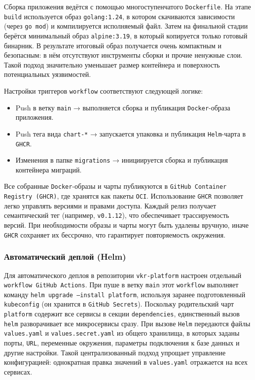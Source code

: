 Сборка приложения ведётся с помощью многоступенчатого \texttt{Dockerfile}. На этапе \texttt{build} используется образ \texttt{golang:1.24}, в котором скачиваются зависимости (через \texttt{go mod}) и компилируется исполняемый файл. Затем на финальной стадии берётся минимальный образ \texttt{alpine:3.19}, в который копируется только готовый бинарник. В результате итоговый образ получается очень компактным и безопасным: в нём отсутствуют инструменты сборки и прочие ненужные слои. Такой подход значительно уменьшает размер контейнера и поверхность потенциальных уязвимостей.

Настройки триггеров \texttt{workflow} соответствуют следующей логике:
\begin{itemize}
    \item Push в ветку \texttt{main} → выполняется сборка и публикация \texttt{Docker}-образа приложения.
    \item Push тега вида \texttt{chart-*} → запускается упаковка и публикация \texttt{Helm}-чарта в \texttt{GHCR}.
    \item Изменения в папке \texttt{migrations} → инициируется сборка и публикация контейнера миграций.
\end{itemize}
\noindent Все собранные \texttt{Docker}-образы и чарты публикуются в \texttt{GitHub Container Registry (GHCR)}, где хранятся как пакеты \texttt{OCI}. Использование \texttt{GHCR} позволяет легко управлять версиями и правами доступа. Каждый релиз получает семантический тег (например, \texttt{v0.1.12}), что обеспечивает трассируемость версий. При необходимости образы и чарты могут быть удалены вручную, иначе \texttt{GHCR} сохраняет их бессрочно, что гарантирует повторяемость окружения.

\subsubsection*{Автоматический деплой (Helm)}
Для автоматического деплоя в репозитории \texttt{vkr-platform} настроен отдельный \texttt{workflow GitHub Actions}. При пуше в ветку \texttt{main} этот \texttt{workflow} выполняет команду \texttt{helm upgrade --install platform}, используя заранее подготовленный \texttt{kubeconfig} (он хранится в \texttt{GitHub Secrets}). Поскольку родительский чарт \texttt{platform} содержит все сервисы в секции \texttt{dependencies}, единственный вызов \texttt{helm} разворачивает все микросервисы сразу. При вызове \texttt{Helm} передаются файлы \texttt{values.yaml} и \texttt{values.secret.yaml} из общего хранилища, в которых заданы порты, \texttt{URL}, переменные окружения, параметры подключения к базе данных и другие настройки. Такой централизованный подход упрощает управление конфигурацией: однократная правка значений в \texttt{values.yaml} отражается на всех сервисах.

